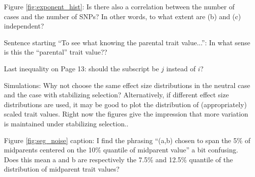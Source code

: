 
\begin{point}{}
    Figure \ref{fig:exponent_hist}: Is there also a correlation between the number of cases and the number of SNPs? In other words, to what extent are (b) and (c) independent?
\end{point}


\begin{point}{\revref}
    Sentence starting ``To see what knowing the parental trait value...'': In what sense is this the ``parental'' trait value??
\end{point}


\begin{point}{\revref}
    Last inequality on Page 13: should the subscript be $j$ instead of $i$?
\end{point}


\begin{point}{}
    Simulations: Why not choose the same effect size distributions in the neutral case and the case with stabilizing selection? Alternatively, if different effect size distributions are used, it may be good to plot the distribution of (appropriately) scaled trait values. Right now the figures give the impression that more variation is maintained under stabilizing selection..
\end{point}


\begin{point}{}
    Figure \ref{fig:seg_noise} caption: I find the phrasing ``(a,b) chosen to span the 5\% of midparents centered on the 10\% quantile of midparent value'' a bit confusing. Does this mean a and b are respectively the 7.5\% and 12.5\% quantile of the distribution of midparent trait values?
\end{point}

